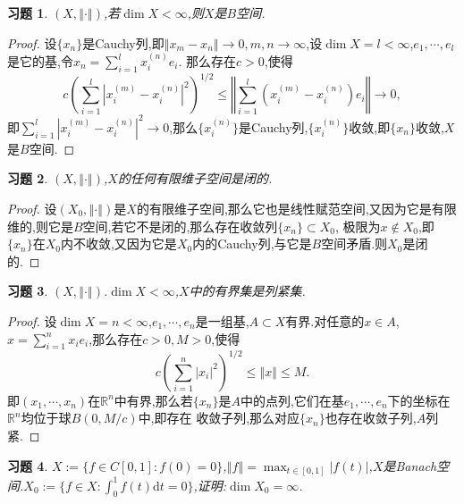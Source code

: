 \documentclass[a4paper,oneside,12pt]{ctexart}
\theoremstyle{plain}
\newtheorem{exercise}{习题}
\theoremstyle{nonumberplain}
\theoremstyle{nonumberplain}
\newtheorem{proof}{证明.}
\newcommand{\dif}{\mathrm{d}}
\newcommand{\R}{\mathbb{R}}
\newcommand{\abs}[1]{\left\vert#1\right\vert}
\newcommand{\norm}[1]{\left\Vert#1\right\Vert}
\begin{document}
    \begin{exercise}
        \label{ex:5}
        $(X,\norm{\cdot})$,若$\dim X<\infty$,则$X$是$B$空间.
    \end{exercise}

    \begin{proof}
        设$\{x_n\}$是Cauchy列,即$\norm{x_m-x_n}\to 0,m,n\to\infty$,设$\dim X=l<\infty$,$e_1,\cdots,e_l$是它的基,令$x_n=\sum_{i=1}^lx_i^{(n)}e_i$.
        那么存在$c>0$,使得 
        \begin{equation*}
            c\left(\sum_{i=1}^l\abs{x_i^{(m)}-x_i^{(n)}}^2\right)^{1/2}\leqslant \norm{\sum_{i=1}^l(x_i^{(m)}-x_i^{(n)})e_i}\to 0,
        \end{equation*}
        即$\sum_{i=1}^l\abs{x_i^{(m)}-x_i^{(n)}}^2\to 0$,那么$\{x_i^{(n)}\}$是Cauchy列,$\{x_i^{(n)}\}$收敛,即$\{x_n\}$收敛,$X$是$B$空间.
    \end{proof}

    \begin{exercise}
        \label{ex:6}
        $(X,\norm{\cdot})$,$X$的任何有限维子空间是闭的.
    \end{exercise}

    \begin{proof}
        设$(X_0,\norm{\cdot})$是$X$的有限维子空间,那么它也是线性赋范空间,又因为它是有限维的,则它是$B$空间,若它不是闭的,那么存在收敛列$\{x_n\}\subset X_0$,
        极限为$x\notin X_0$,即$\{x_n\}$在$X_0$内不收敛,又因为它是$X_0$内的Cauchy列,与它是$B$空间矛盾.则$X_0$是闭的.
    \end{proof}

    \begin{exercise}
        \label{ex:7}
        $(X,\norm{\cdot})$.$\dim X<\infty$,$X$中的有界集是列紧集.
    \end{exercise}

    \begin{proof}
        设$\dim X=n<\infty$,$e_1,\cdots,e_n$是一组基,$A\subset X$有界.对任意的$x\in A$,$x=\sum_{i=1}^nx_ie_i$,那么存在$c>0,M>0$,使得 
        \begin{equation*}
            c\left(\sum_{i=1}^n\abs{x_i}^2\right)^{1/2}\leqslant\norm{x}\leqslant M.
        \end{equation*}
        即$(x_1,\cdots,x_n)$在$\R^n$中有界,那么若$\{x_n\}$是$A$中的点列,它们在基$e_1,\cdots,e_n$下的坐标在$\R^n$均位于球$B(0,M/c)$中,即存在
        收敛子列,那么对应$\{x_n\}$也存在收敛子列,$A$列紧.
    \end{proof}

    \begin{exercise}
        \label{ex:8}
        $X:=\{f\in C[0,1]:f(0)=0\}$,$\norm{f}=\max_{t\in[0,1]}\abs{f(t)}$,$X$是Banach空间.$X_0:=\{f\in X:\int_0^1 f(t)\dif t=0\}$,证明:$\dim X_0=\infty$.
    \end{exercise}
\end{document}
